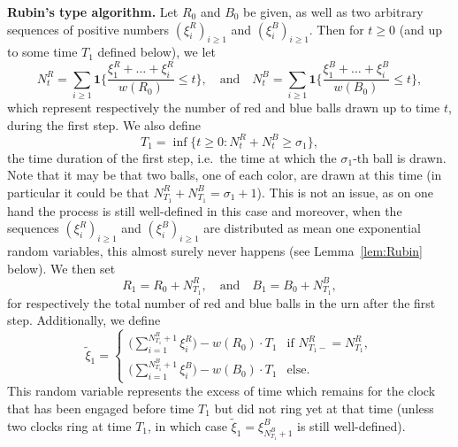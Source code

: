 \documentclass[10pt,a4paper]{amsart}
\newcommand{\1}{{\text{\Large $\mathfrak 1$}}}
\begin{document}
\vspace{0.2cm}
\noindent \textbf{Rubin's type algorithm.} 
Let $R_0$ and $B_0$ be given, as well as two arbitrary sequences of positive numbers $(\xi_i^R)_{i\ge 1}$ and $(\xi_i^B)_{i\ge 1}$. Then for $t\ge 0$ (and up to some time $T_1$ defined below), we let  
$$N_t^R = \sum_{i\ge 1} \mathbf 1\big\{\frac{\xi_1^R + \dots + \xi_i^R}{w(R_0)} \le t\big\}, \quad \text{and}\quad N_t^B = \sum_{i\ge 1} \mathbf 1\big\{\frac{\xi_1^B + \dots + \xi_i^B}{w(B_0)} \le t\big\},$$
which represent respectively the number of red and blue balls drawn up to time $t$, during the first step.  
We also define  
$$T_1 = \inf \{t\ge 0 : N_t^R + N_t^B\ge  \sigma_1\},$$
the time duration of the first step, i.e.~the time at which the $\sigma_1$-th ball is drawn. 
Note that it may be that two balls, one of each color, are drawn at this time (in particular it could be that $N_{T_1}^R + N_{T_1}^B =\sigma_1 +1$). This is not an issue, as on one hand the process is still well-defined in this case and moreover, when the sequences $(\xi_i^R)_{i\ge 1}$ and $(\xi_i^B)_{i\ge 1}$ are distributed as mean one exponential random variables, this almost surely never happens (see Lemma~\ref{lem:Rubin} below). We then set 
$$R_1 = R_0 + N_{T_1}^R, \quad  \text{and} \quad B_1 =B_0 +  N_{T_1}^B,$$
for respectively the total number of red and blue balls in the urn after the first step. 
Additionally, we define
\begin{equation}
\widetilde \xi_1 =\left\{ 
\begin{array}{ll}
\Big( \sum_{i=1}^{N_{T_1}^R+1} \xi_i^R\Big) - w(R_0)\cdot T_1 & \text{if } N_{T_1-}^R=N_{T_1}^R,\\
\Big( \sum_{i=1}^{N_{T_1}^B+1} \xi_i^B\Big) - w(B_0)\cdot T_1 & \text{else}.
\end{array}
\right. 
\end{equation}
This random variable represents the excess of time which remains for the clock that has been engaged before time $T_1$ but did not ring yet at that time (unless two clocks ring at time $T_1$, in which case $\widetilde \xi_1=\xi^B_{N_{T_1}^B +1}$ is still well-defined). 
\end{document}
